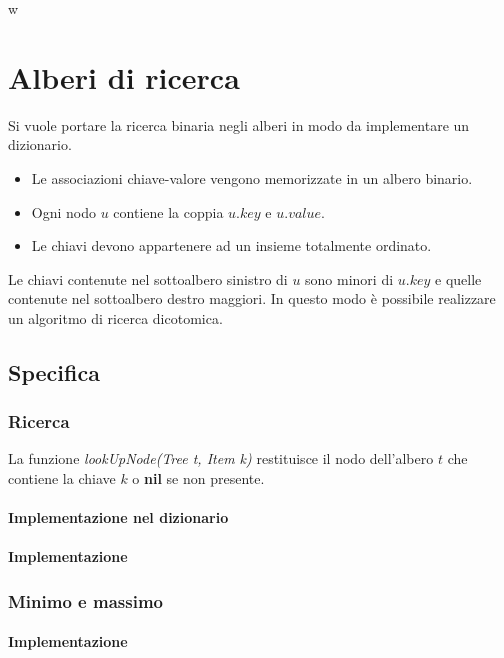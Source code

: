 w\chapter{Alberi di ricerca}
Si vuole portare la ricerca binaria negli alberi in modo da implementare un dizionario.
\begin{itemize}
    \item Le associazioni chiave-valore vengono memorizzate in un albero binario.
    \item Ogni nodo $u$ contiene la coppia $u.key$ e $u.value$.
    \item Le chiavi devono appartenere ad un insieme totalmente ordinato.
\end{itemize}
Le chiavi contenute nel sottoalbero sinistro di $u$ sono minori di $u.key$ e quelle contenute nel sottoalbero destro maggiori. In questo modo \`e possibile
realizzare un algoritmo di ricerca dicotomica.
\section{Specifica}


\newpage
\subsection{Ricerca}
La funzione \emph{lookUpNode(Tree t, Item k)} restituisce il nodo dell'albero $t$ che contiene la chiave $k$ o \textbf{nil} se non presente.
\subsubsection{Implementazione nel dizionario}

\subsubsection{Implementazione}
\begin{multicols}{2}
    
    
\end{multicols}
\subsection{Minimo e massimo}
\subsubsection{Implementazione}
\begin{multicols}{2}
    
    \columnbreak
    
\end{multicols}
